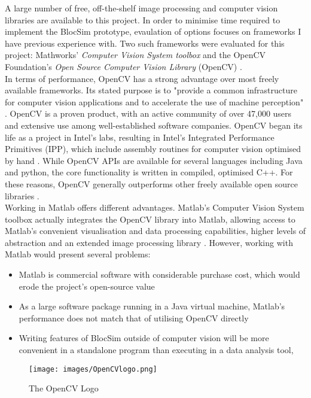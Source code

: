 A large number of free, off-the-shelf image processing and computer vision libraries are available to this project. In order to minimise time required to implement the BlocSim prototype, evaulation of options focuses on frameworks I have previous experience with. Two such frameworks were evaluated for this project: Mathworks' \textit{Computer Vision System toolbox} \cite{matlab} and the OpenCV Foundation's \textit{Open Source Computer Vision Library} (OpenCV) \cite{opencv}.
\\

In terms of performance, OpenCV has a strong advantage over most freely available frameworks.
Its stated purpose is to "provide a common infrastructure for computer vision applications and to accelerate the use of machine perception" \cite{opencv}. OpenCV is a proven product, with an active community of over 47,000 users and extensive use among well-established software companies. OpenCV began its life as a project in Intel's labs, resulting in Intel's Integrated Performance Primitives (IPP), which include assembly routines for computer vision optimised by hand \cite{opencvBook}. While OpenCV APIs are available for several languages including Java and python, the core functionality is written in compiled, optimised C++. For these reasons, OpenCV generally outperforms other freely available open source libraries \cite{opencvBench}.
\\

Working in Matlab offers different advantages. Matlab's Computer Vision System toolbox actually integrates the OpenCV library into Matlab, allowing access to Matlab's convenient visualisation and data processing capabilities, higher levels of abstraction and an extended image processing library \cite{matlabCV}. However, working with Matlab would present several problems:

\begin{itemize}
\item Matlab is commercial software with considerable purchase cost, which would erode the project's open-source value
\item As a large software package running in a Java virtual machine, Matlab's performance does not match that of utilising OpenCV directly
\item Writing features of BlocSim outside of computer vision will be more convenient in a standalone program than executing in a data analysis tool,
\end{itemize}

\begin{figure}[ht!]
\centering
\texttt{[image: images/OpenCVlogo.png]}
\caption{The OpenCV Logo \cite{opencv}}
\label{im:cvlogo}
\end{figure}

